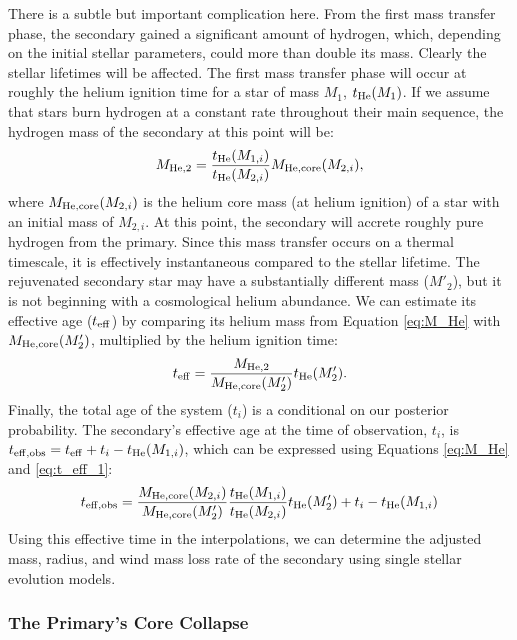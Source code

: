 \documentclass[12pt, preprint]{aastex}
\begin{document}
There is a subtle but important complication here. From the first mass transfer phase, the secondary gained a significant amount of hydrogen, which, depending on the initial stellar parameters, could more than double its mass. Clearly the stellar lifetimes will be affected. The first mass transfer phase will occur at roughly the helium ignition time for a star of mass $M_1$, $t_{\rm He} (M_1)$. If we assume that stars burn hydrogen at a constant rate throughout their main sequence, the hydrogen mass of the secondary at this point will be:
\begin{equation}
M_{\rm He,2} = \frac{t_{\rm He}(M_{1,i})}{t_{\rm He}(M_{2,i})} M_{\rm He,core}(M_{2,i}), \label{eq:M_He}
\end{equation}
where $M_{\rm He,core}(M_{2,i})$ is the helium core mass (at helium ignition) of a star with an initial mass of $M_{2,i}$. At this point, the secondary will accrete roughly pure hydrogen from the primary. Since this mass transfer occurs on a thermal timescale, it is effectively instantaneous compared to the stellar lifetime. The rejuvenated secondary star may have a substantially different mass ($M'_2$), but it is not beginning with a cosmological helium abundance. We can estimate its effective age ($t_{\rm eff}$) by comparing its helium mass from Equation \ref{eq:M_He} with $M_{\rm He,core}(M_2')$, multiplied by the helium ignition time:
\begin{equation}
t_{\rm eff} = \frac{M_{\rm He,2}}{M_{\rm He,core} (M_2') } t_{\rm He} (M_2'). \label{eq:t_eff_1}
\end{equation}
Finally, the total age of the system ($t_i$) is a conditional on our posterior probability. The secondary's effective age at the time of observation, $t_i$, is $t_{\rm eff,obs} = t_{\rm eff} + t_i - t_{\rm He}(M_{1,i})$, which can be expressed using Equations \ref{eq:M_He} and \ref{eq:t_eff_1}:
\begin{equation}
t_{\rm eff,obs} = \frac{M_{\rm He,core}(M_{2,i})}{M_{\rm He,core}(M_2')} \frac{t_{\rm He}(M_{1,i})}{t_{\rm He}(M_{2,i})} t_{\rm He}(M_2')
  + t_i - t_{\rm He}(M_{1,i}) \label{eq:t_eff_obs_full}
\end{equation}
Using this effective time in the interpolations, we can determine the adjusted mass, radius, and wind mass loss rate of the secondary using single stellar evolution models. 


\subsubsection{The Primary's Core Collapse} \label{sec:trans_SN}
\end{document}
